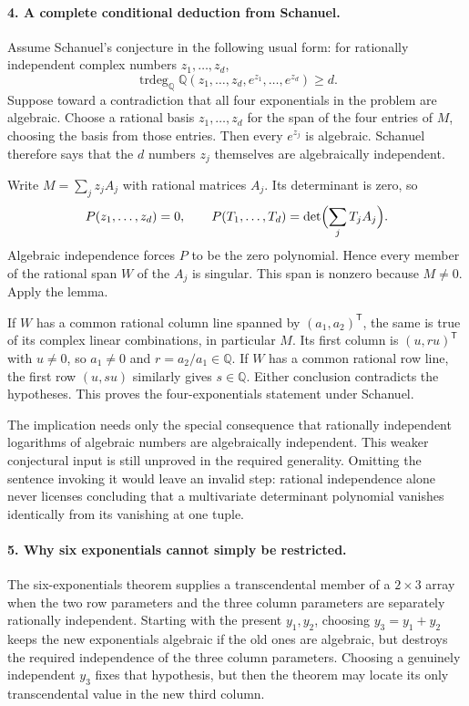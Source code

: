 \documentclass[11pt]{article}
\begin{document}
\paragraph{4. A complete conditional deduction from Schanuel.}
Assume Schanuel's conjecture in the following usual form: for rationally independent complex numbers $z_1,\ldots,z_d$,
\[
 \operatorname{trdeg}_{\mathbb Q}
 \mathbb Q(z_1,\ldots,z_d,e^{z_1},\ldots,e^{z_d})\ge d.
\]
Suppose toward a contradiction that all four exponentials in the problem are algebraic. Choose a rational basis $z_1,\ldots,z_d$ for the span of the four entries of $M$, choosing the basis from those entries. Then every $e^{z_j}$ is algebraic. Schanuel therefore says that the $d$ numbers $z_j$ themselves are algebraically independent.

Write $M=\sum_jz_jA_j$ with rational matrices $A_j$. Its determinant is zero, so
\[
 P(z_1,\ldots,z_d)=0,\qquad
 P(T_1,\ldots,T_d)=\det\Bigl(\sum_jT_jA_j\Bigr).
\]
Algebraic independence forces $P$ to be the zero polynomial. Hence every member of the rational span $W$ of the $A_j$ is singular. This span is nonzero because $M\ne0$. Apply the lemma.

If $W$ has a common rational column line spanned by $(a_1,a_2)^{\mathsf T}$, the same is true of its complex linear combinations, in particular $M$. Its first column is $(u,ru)^{\mathsf T}$ with $u\ne0$, so $a_1\ne0$ and $r=a_2/a_1\in\mathbb Q$. If $W$ has a common rational row line, the first row $(u,su)$ similarly gives $s\in\mathbb Q$. Either conclusion contradicts the hypotheses. This proves the four-exponentials statement under Schanuel.

The implication needs only the special consequence that rationally independent logarithms of algebraic numbers are algebraically independent. This weaker conjectural input is still unproved in the required generality. Omitting the sentence invoking it would leave an invalid step: rational independence alone never licenses concluding that a multivariate determinant polynomial vanishes identically from its vanishing at one tuple.

\paragraph{5. Why six exponentials cannot simply be restricted.}
The six-exponentials theorem supplies a transcendental member of a $2\times3$ array when the two row parameters and the three column parameters are separately rationally independent. Starting with the present $y_1,y_2$, choosing $y_3=y_1+y_2$ keeps the new exponentials algebraic if the old ones are algebraic, but destroys the required independence of the three column parameters. Choosing a genuinely independent $y_3$ fixes that hypothesis, but then the theorem may locate its only transcendental value in the new third column.
\end{document}
